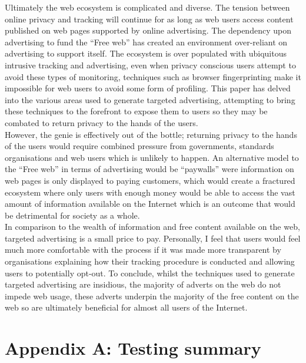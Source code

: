 \documentclass[12pt]{article}
\begin{document}
Ultimately the web ecosystem is complicated and diverse. The tension between online privacy and tracking will continue for as long as web users access content published on web pages supported by online advertising. The dependency upon advertising to fund the ``Free web'' has created an environment over-reliant on advertising to support itself. The ecosystem is over populated with ubiquitous intrusive tracking and advertising, even when privacy conscious users attempt to avoid these types of monitoring, techniques such as browser fingerprinting make it impossible for web users to avoid some form of profiling. This paper has delved into the various areas used to generate targeted advertising, attempting to bring these techniques to the forefront to expose them to users so they may be combated to return privacy to the hands of the users. \\

However, the genie is effectively out of the bottle; returning privacy to the hands of the users would require combined pressure from governments, standards organisations and web users which is unlikely to happen. An alternative model to the ``Free web'' in terms of advertising would be ``paywalls'' were information on web pages is only displayed to paying customers, which would create a fractured ecosystem where only users with enough money would be able to access the vast amount of information available on the Internet which is an outcome that would be detrimental for society as a whole. \\

In comparison to the wealth of information and free content available on the web, targeted advertising is a small price to pay. Personally, I feel that users would feel much more comfortable with the process if it was made more transparent by organisations explaining how their tracking procedure is conducted and allowing users to potentially opt-out. To conclude, whilst the techniques used to generate targeted advertising are insidious, the majority of adverts on the web do not impede web usage, these adverts underpin the majority of the free content on the web so are ultimately beneficial for almost all users of the Internet.

\section{Appendix A: Testing summary} \label{testSummary}
\end{document}
